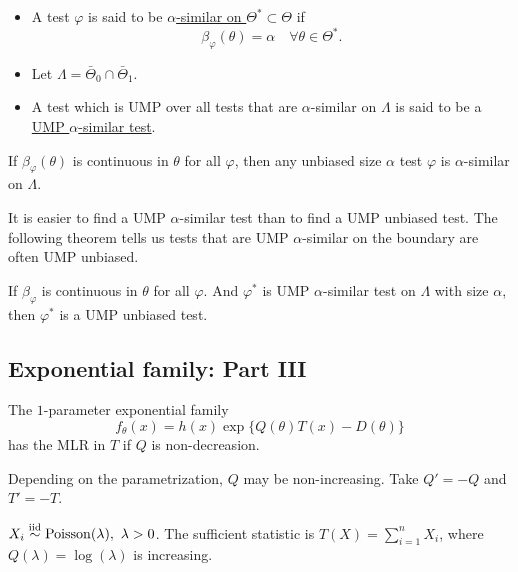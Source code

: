 \begin{mydef}\textbf{ }
	\begin{itemize}
		\item A test $\varphi$ is said to be \uline{$\alpha$-similar on $\Theta^\ast \subset \Theta$} if 
		$$\beta_\varphi(\theta) = \alpha \quad \forall \theta \in \Theta^\ast.$$
		
		\item Let $\Lambda = \bar{\Theta}_0 \cap \bar{\Theta}_1$.
		
		\item A test which is UMP over all tests that are $\alpha$-similar on $\Lambda$ is said to be a \uline{UMP $\alpha$-similar test}.
	\end{itemize}
\end{mydef}
\begin{remark}
	If $\beta_\varphi(\theta)$ is continuous in $\theta$ for all $\varphi$, then any unbiased size $\alpha$ test $\varphi$ is $\alpha$-similar on $\Lambda$.
\end{remark}

It is easier to find a UMP $\alpha$-similar test than to find a UMP unbiased test. The following theorem tells us tests that are UMP $\alpha$-similar on the boundary are often UMP unbiased.
\begin{thm}
	If $\beta_\varphi$ is continuous in $\theta$ for all $\varphi$. And $\varphi^\ast$ is UMP $\alpha$-similar test on $\Lambda$ with size $\alpha$, then $\varphi^\ast$ is a UMP unbiased test.
\end{thm} 
\subsection{Exponential family: Part III}
\begin{thm}
	The $1$-parameter exponential family
	$$f_\theta(x) = h(x) \exp\{ Q(\theta) T(x) - D(\theta) \} $$
	has the MLR in $T$ if $Q$ is non-decreasion.
\end{thm}
\begin{remark}
	Depending on the parametrization, $Q$ may be non-increasing. Take $Q'= -Q$ and $T' = - T$.
\end{remark}
\begin{exap}
	$X_i \SimIID \mathrm{Poisson}(\lambda), \ \lambda>0$. The sufficient statistic is $T(X) = \sum_{i=1}^n X_i$, where $Q(\lambda) = \log(\lambda)$ is increasing.
\end{exap}

